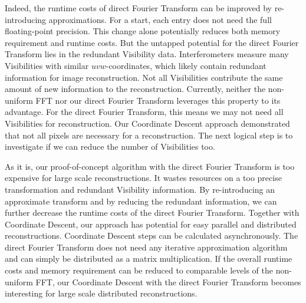 Indeed, the runtime costs of direct Fourier Transform can be improved by re-introducing approximations. For a start, each entry does not need the full floating-point precision. This change alone potentially reduces both memory requirement and runtime costs. But the untapped potential for the direct Fourier Transform lies in the redundant Visibility data. Interferometers measure many Visibilities with similar $uvw$-coordinates, which likely contain redundant information for image reconstruction. Not all Visibilities contribute the same amount of new information to the reconstruction. Currently, neither the non-uniform FFT nor our direct Fourier Transform leverages this property to its advantage. For the direct Fourier Transform, this means we may not need all Visibilities for reconstruction. Our Coordinate Descent approach demonstrated that not all pixels are necessary for a reconstruction. The next logical step is to investigate if we can reduce the number of Visibilities too.



As it is, our proof-of-concept algorithm with the direct Fourier Transform is too expensive for large scale reconstructions. It wastes resources on a too precise transformation and redundant Visibility information. By re-introducing an approximate transform and by reducing the redundant information, we can further decrease the runtime costs of the direct Fourier Transform. Together with Coordinate Descent, our approach has potential for easy parallel and distributed reconstructions. Coordinate Descent steps can be calculated asynchronously. The direct Fourier Transform does not need any iterative approximation algorithm and can simply be distributed as a matrix multiplication. If the overall runtime costs and memory requirement can be reduced to comparable levels of the non-uniform FFT, our Coordinate Descent with the direct Fourier Transform becomes interesting for large scale distributed reconstructions.


















 